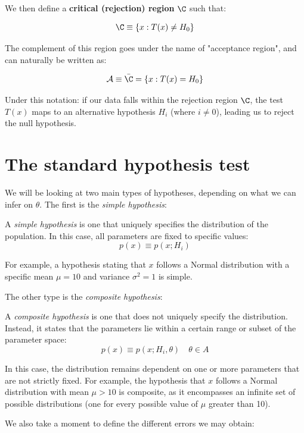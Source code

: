 We then define a \textbf{critical (rejection) region} $\C$ such that:

	\[
	\C \equiv \{x: T(x)\neq H_0\}
	\]

The complement of this region goes under the name of "acceptance region", and can naturally be written as:

	\[
	\mathcal{A}\equiv\bar{\C} = \{x: T(x) = H_0\}
	\]

Under this notation: if our data falls within the rejection region $\C$, the test $T(x)$ maps to an alternative hypothesis $H_i$ (where $i \neq 0$), leading us to reject the null hypothesis.

\section{The standard hypothesis test}
We will be looking at two main types of hypotheses, depending on what we can infer on $\theta$. The first is the \emph{simple hypothesis}:

\begin{definition}
	A \emph{simple hypothesis} is one that uniquely specifies the distribution of the population. In this case, all parameters are fixed to specific values:
	\[
	p(x) \equiv p(x; H_i)
	\]
\end{definition}

For example, a hypothesis stating that $x$ follows a Normal distribution with a specific mean $\mu=10$ and variance $\sigma^2=1$ is simple.

The other type is the \emph{composite hypothesis}:
\begin{definition}
	A \emph{composite hypothesis} is one that does not uniquely specify the distribution. Instead, it states that the parameters lie within a certain range or subset of the parameter space:
	\[
	p(x) \equiv p(x; H_i, \theta) \quad \theta \in A
	\]
\end{definition}

In this case, the distribution remains dependent on one or more parameters that are not strictly fixed. For example, the hypothesis that $x$ follows a Normal distribution with mean $\mu > 10$ is composite, as it encompasses an infinite set of possible distributions (one for every possible value of $\mu$ greater than 10).

We also take a moment to define the different errors we may obtain:

